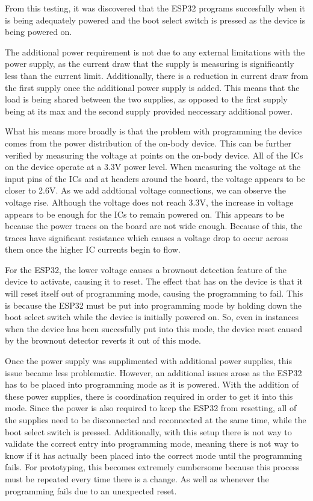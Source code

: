 From this testing, it was discovered that the ESP32 programs succesfully when it is being adequately powered
and the boot select switch is pressed as the device is being powered on.

The additional power requirement is not due to any external limitations with the power supply,
as the current draw that the supply is measuring is significantly less than the current limit.
Additionally, there is a reduction in current draw from the first supply once the additional power supply is added.
This means that the load is being shared between the two supplies,
as opposed to the first supply being at its max and the second supply provided neccessary additional power.

What his means more broadly is that the problem with programming the device comes from the power distribution of the on-body device.
This can be further verified by measuring the voltage at points on the on-body device.
All of the ICs on the device operate at a 3.3V power level.
When measuring the voltage at the input pins of the ICs and at headers around the board, the voltage appears to be closer to 2.6V.
As we add addtional voltage connections, we can observe the voltage rise.
Although the voltage does not reach 3.3V, the increase in voltage appears to be enough for the ICs to remain powered on.
This appears to be because the power traces on the board are not wide enough.
Because of this, the traces have significant resistance which causes a voltage drop to occur across them once the higher IC currents begin to flow.

For the ESP32, the lower voltage causes a brownout detection feature of the device to activate, causing it to reset.
The effect that has on the device is that it will reset itself out of programming mode, causing the programming to fail.
This is because the ESP32 must be put into programming mode by holding down the boot select switch while the device is initially powered on.
So, even in instances when the device has been succesfully put into this mode,
the device reset caused by the brownout detector reverts it out of this mode.

Once the power supply was supplimented with additional power supplies, this issue became less problematic.
However, an additional issues arose as the ESP32 has to be placed into programming mode as it is powered.
With the addition of these power supplies, there is coordination required in order to get it into this mode.
Since the power is also required to keep the ESP32 from resetting, all of the supplies need to be disconnected and reconnected at the same time,
while the boot select switch is pressed.
Additionally, with this setup there is not way to validate the correct entry into programming mode,
meaning there is not way to know if it has actually been placed into the correct mode until the programming fails.
For prototyping, this becomes extremely cumbersome because this process must be repeated every time there is a change.
As well as whenever the programming fails due to an unexpected reset.

